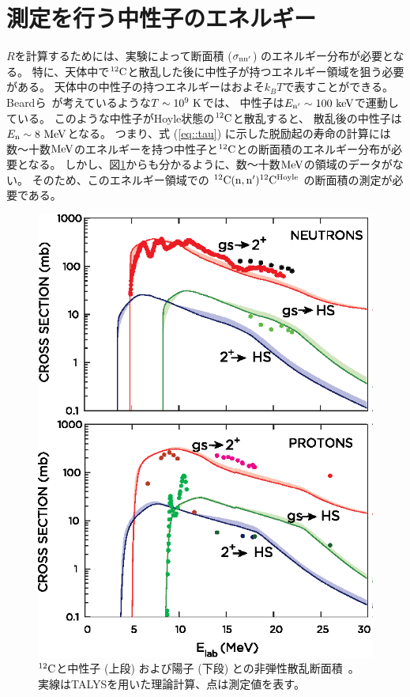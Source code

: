 \section{測定を行う中性子のエネルギー}
$R$を計算するためには、実験によって断面積 ($\sigma_{\rm nn'}$) のエネルギー分布が必要となる。
特に、天体中で${}^{12}{\rm C}$と散乱した後に中性子が持つエネルギー領域を狙う必要がある。
天体中の中性子の持つエネルギーはおよそ$k_{B}T$で表すことができる。
Beardら~\cite{hotdensemedium}が考えているような$T\sim10^{9}~{\rm K}$では、
中性子は$E_{\rm n'}\sim100~{\rm keV}$で運動している。%
このような中性子がHoyle状態の${}^{12}{\rm C}$と散乱すると、
散乱後の中性子は$E_{\rm n}\sim8~{\rm MeV}$となる。
つまり、式 (\ref{eq::tau}) に示した脱励起の寿命の計算には
数〜十数${\rm MeV}$のエネルギーを持つ中性子と${}^{12}{\rm C}$との断面積のエネルギー分布が必要となる。
しかし、図\ref{fig::crosssection_pres}からも分かるように、数〜十数${\rm MeV}$の領域のデータがない。
そのため、このエネルギー領域での ${}^{12}{\rm C}({\rm n,n'}){}^{12}{\rm C}^{{\rm Hoyle}}$ の断面積の測定が必要である。
\begin{figure}
  \centering
  \includegraphics[clip,width=0.6\columnwidth]{eps/cross_section_p_and_n.eps}
  \caption[${}^{12}{\rm C}$と中性子 (上段) および陽子 (下段) との非弾性散乱断面積。]
          {${}^{12}{\rm C}$と中性子 (上段) および陽子 (下段) との非弾性散乱断面積~\cite{hotdensemedium}。
  実線はTALYSを用いた理論計算、点は測定値を表す。}
  \label{fig::crosssection_pres}
\end{figure}

